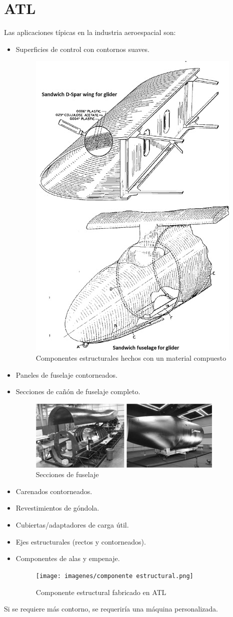 \section{ATL}

Las aplicaciones típicas en la industria aeroespacial son:
\begin{itemize}
    \item Superficies de control con contornos suaves.
    \begin{figure}[H]
        \centering
        \includegraphics[width=0.35\linewidth]{Superficies de control.png}
        \caption{Componentes estructurales hechos con un material compuesto}
        \label{fig:enter-label}
    \end{figure}
    \item Paneles de fuselaje contorneados.
    \item Secciones de cañón de fuselaje completo.
\begin{figure}[H]
    \centering
    \includegraphics[width=0.8\linewidth]{Secciones de fuselaje.png}
    \caption{Secciones de fuselaje}
    \label{fig:enter-label}
\end{figure}
    \item Carenados contorneados.
    \item Revestimientos de góndola.
    \item Cubiertas/adaptadores de carga útil.
    \item Ejes estructurales (rectos y contorneados).  
    \item Componentes de alas y empenaje.
    \begin{figure}[H]
        \centering
        \texttt{[image: imagenes/componente estructural.png]}
        \caption{Componente estructural fabricado en ATL}
        \label{fig:enter-label}   
    \end{figure}
\end{itemize}
Si se requiere más contorno, se requeriría una máquina personalizada.

